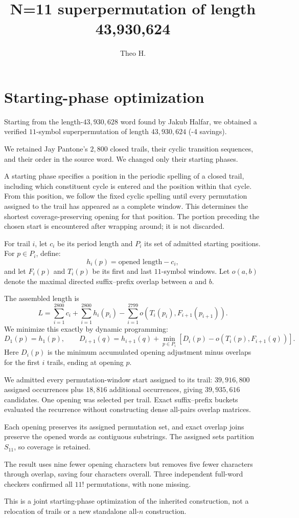 \documentclass[11pt]{article}
\title{N=11 superpermutation of length 43,930,624}
\author{Theo H.}
\begin{document}
\maketitle

\section{Starting-phase optimization}

Starting from the length-$43{,}930{,}628$ word found by Jakub Halfar, we obtained
a verified $11$-symbol superpermutation of length $43{,}930{,}624$ (-4 savings).

We retained Jay Pantone's $2{,}800$ closed trails, their cyclic
transition sequences, and their order in the source word.
We changed only their starting phases.

A starting phase specifies a position in the periodic spelling
of a closed trail, including which constituent cycle is entered
and the position within that cycle. From this position, we follow
the fixed cyclic spelling until every permutation assigned to
the trail has appeared as a complete window. This determines
the shortest coverage-preserving opening for that position.
The portion preceding the chosen start is encountered after
wrapping around; it is not discarded.

For trail $i$, let $c_i$ be its period length and $P_i$ its set
of admitted starting positions. For $p\in P_i$, define:
\[
h_i(p)=\text{opened length}-c_i,
\]
and let $F_i(p)$ and $T_i(p)$ be its first and last
$11$-symbol windows. Let $o(a,b)$ denote the maximal directed
suffix--prefix overlap between $a$ and $b$.

The assembled length is
\[
L=
\sum_{i=1}^{2800}c_i
+\sum_{i=1}^{2800}h_i(p_i)
-\sum_{i=1}^{2799}
o\!\left(T_i(p_i),F_{i+1}(p_{i+1})\right).
\]
We minimize this exactly by dynamic programming:
\[
D_1(p)=h_1(p),
\qquad
D_{i+1}(q)=h_{i+1}(q)
+\min_{p\in P_i}
\left[D_i(p)-o\!\left(T_i(p),F_{i+1}(q)\right)\right].
\]
Here $D_i(p)$ is the minimum accumulated opening adjustment
minus overlaps for the first $i$ trails, ending at opening $p$.

We admitted every permutation-window start assigned to its
trail: $39{,}916{,}800$ assigned occurrences plus $18{,}816$
additional occurrences, giving $39{,}935{,}616$ candidates.
One opening was selected per trail. Exact suffix--prefix
buckets evaluated the recurrence without constructing dense
all-pairs overlap matrices.

Each opening preserves its assigned permutation set, and exact
overlap joins preserve the opened words as contiguous substrings.
The assigned sets partition $S_{11}$, so coverage is retained.

The result uses nine fewer opening characters but removes five
fewer characters through overlap, saving four characters overall.
Three independent full-word checkers confirmed all $11!$
permutations, with none missing.

This is a joint starting-phase optimization of the inherited
construction, not a relocation of trails or a new standalone
all-$n$ construction.
\end{document}
